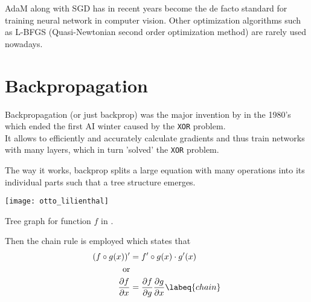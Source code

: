 AdaM along with SGD has in recent years become the de facto standard for training neural network in computer vision.
Other optimization algorithms such as L-BFGS (Quasi-Newtonian second order optimization method) are rarely used nowadays.




\section{Backpropagation}
Backpropagation (or just backprop) was the major invention by \citeauthor{backprop} in the 1980's which ended the first AI winter caused by the \lstinline|XOR| problem. \\
It allows to efficiently and accurately calculate gradients and thus train networks with many layers, which in turn 'solved' the \lstinline|XOR| problem.

The way it works, backprop splits a large equation with many operations into its individual parts such that a tree structure emerges.
\begin{marginfigure}
    \texttt{[image: otto\_lilienthal]}
    \caption[]{Tree graph for function $f$ in .}
\end{marginfigure}
Then the chain rule is employed which states that
\begin{align}
    (f \circ g (x))' & = f' \circ g(x) \cdot g'(x) \\
    \text{or} \\
    \frac{\partial f}{\partial x} & = \frac{\partial f}{\partial g} \frac{\partial g}{\partial x}
    \labeq{chain}
\end{align}

